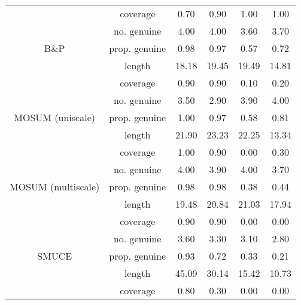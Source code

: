 \begin{tabular}{|c|c|c|c|c|c|}
   & coverage & 0.70 & 0.90 & 1.00 & 1.00 \\ 
   & no. genuine & 4.00 & 4.00 & 3.60 & 3.70 \\ 
  B\&P & prop. genuine & 0.98 & 0.97 & 0.57 & 0.72 \\ 
   & length & 18.18 & 19.45 & 19.49 & 14.81 \\ 
   & coverage & 0.90 & 0.90 & 0.10 & 0.20 \\ 
   & no. genuine & 3.50 & 2.90 & 3.90 & 4.00 \\ 
  MOSUM (uniscale) & prop. genuine & 1.00 & 0.97 & 0.58 & 0.81 \\ 
   & length & 21.90 & 23.23 & 22.25 & 13.34 \\ 
   & coverage & 1.00 & 0.90 & 0.00 & 0.30 \\ 
   & no. genuine & 4.00 & 3.90 & 4.00 & 3.70 \\ 
  MOSUM (multiscale) & prop. genuine & 0.98 & 0.98 & 0.38 & 0.44 \\ 
   & length & 19.48 & 20.84 & 21.03 & 17.94 \\ 
   & coverage & 0.90 & 0.90 & 0.00 & 0.00 \\ 
   & no. genuine & 3.60 & 3.30 & 3.10 & 2.80 \\ 
  SMUCE & prop. genuine & 0.93 & 0.72 & 0.33 & 0.21 \\ 
   & length & 45.09 & 30.14 & 15.42 & 10.73 \\ 
   & coverage & 0.80 & 0.30 & 0.00 & 0.00 \\ 
   \hline
\end{tabular}
